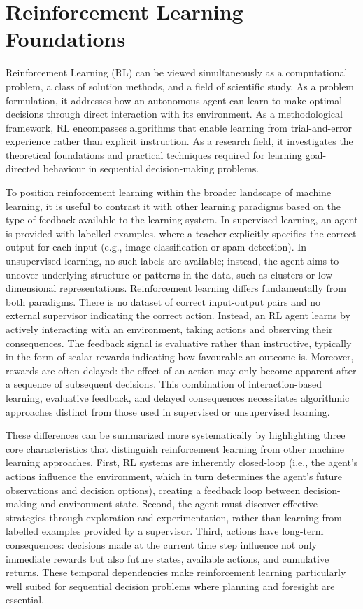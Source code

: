 \section{Reinforcement Learning Foundations}
\label{sec:rl_foundations}

Reinforcement Learning (RL) can be viewed simultaneously as a computational problem, a class of solution methods, and a field of scientific study. As a problem formulation, it addresses how an autonomous agent can learn to make optimal decisions through direct interaction with its environment. As a methodological framework, RL encompasses algorithms that enable learning from trial-and-error experience rather than explicit instruction. As a research field, it investigates the theoretical foundations and practical techniques required for learning goal-directed behaviour in sequential decision-making problems.

To position reinforcement learning within the broader landscape of machine learning, it is useful to contrast it with other learning paradigms based on the type of feedback available to the learning system. In supervised learning, an agent is provided with labelled examples, where a teacher explicitly specifies the correct output for each input (e.g., image classification or spam detection). In unsupervised learning, no such labels are available; instead, the agent aims to uncover underlying structure or patterns in the data, such as clusters or low-dimensional representations. Reinforcement learning differs fundamentally from both paradigms. There is no dataset of correct input-output pairs and no external supervisor indicating the correct action. Instead, an RL agent learns by actively interacting with an environment, taking actions and observing their consequences. The feedback signal is evaluative rather than instructive, typically in the form of scalar rewards indicating how favourable an outcome is. Moreover, rewards are often delayed: the effect of an action may only become apparent after a sequence of subsequent decisions. This combination of interaction-based learning, evaluative feedback, and delayed consequences necessitates algorithmic approaches distinct from those used in supervised or unsupervised learning.

These differences can be summarized more systematically by highlighting three core characteristics that distinguish reinforcement learning from other machine learning approaches. First, RL systems are inherently closed-loop (i.e., the agent's actions influence the environment, which in turn determines the agent's future observations and decision options), creating a feedback loop between decision-making and environment state. Second, the agent must discover effective strategies through exploration and experimentation, rather than learning from labelled examples provided by a supervisor. Third, actions have long-term consequences: decisions made at the current time step influence not only immediate rewards but also future states, available actions, and cumulative returns. These temporal dependencies make reinforcement learning particularly well suited for sequential decision problems where planning and foresight are essential.

